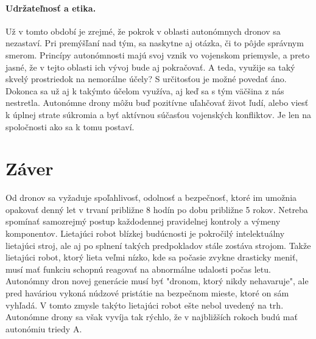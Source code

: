 \documentclass[10pt,twoside,slovak,a4paper]{article}
\begin{document}
\paragraph{Udržateľnosť a etika.} Už v tomto období je zrejmé, že pokrok v oblasti autonómnych dronov sa nezastaví. Pri premýšľaní nad tým, sa naskytne aj otázka, či to pôjde správnym smerom. Princípy autonómnosti majú svoj vznik vo vojenskom priemysle, a preto jasné, že v tejto oblasti ich vývoj bude aj pokračovať. A teda, využije sa taký skvelý prostriedok na nemorálne účely? S určitosťou je možné povedať áno. Dokonca sa už aj k takýmto účelom využíva, aj keď sa s tým väčšina z nás nestretla. Autonómne drony môžu buď pozitívne uľahčovať život ľudí, alebo viesť k úplnej strate súkromia a byť aktívnou súčasťou vojenských konfliktov. Je len na spoločnosti ako sa k tomu postaví.

\section{Záver}
Od dronov sa vyžaduje spoľahlivosť, odolnosť a bezpečnosť, ktoré im umožnia opakovať denný let v trvaní približne 8 hodín po dobu približne 5 rokov. Netreba spomínať samozrejmý postup každodennej pravidelnej kontroly a výmeny komponentov. Lietajúci robot blízkej budúcnosti je pokročilý intelektuálny lietajúci stroj, ale aj po splnení takých predpokladov stále zostáva strojom. Takže lietajúci robot, ktorý lieta veľmi nízko, kde sa počasie zvykne drasticky meniť, musí mať funkciu schopnú reagovať na abnormálne udalosti počas letu. Autonómny dron novej generácie musí byť "dronom, ktorý nikdy nehavaruje", ale pred haváriou vykoná núdzové pristátie na bezpečnom mieste, ktoré on sám vyhľadá. V tomto zmysle takýto lietajúci robot ešte nebol uvedený na trh. Autonómne drony sa však vyvíja tak rýchlo, že v najbližších rokoch budú mať autonómiu triedy A. \cite{nonami2020present}




 
\end{document}
